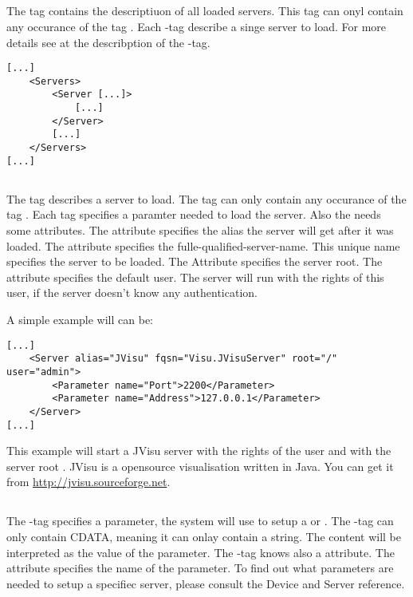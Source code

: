 \subsection{}
The tag  contains the descriptiuon of all loaded servers. This tag can onyl 
contain any occurance of the tag . Each -tag describe a 
singe server to load. For more details see at the describption of the -tag.

\begin{verbatim}
[...]
    <Servers>
        <Server [...]>
            [...]
        </Server>
        [...]
    </Servers>
[...]
\end{verbatim}


\subsection{}
The tag  describes a server to load. The tag can only contain any occurance of the tag
. Each  tag specifies a paramter needed to load the server.
Also the  needs some attributes. The attribute  specifies the alias the
server will get after it was loaded. The attribute  specifies the fulle-qualified-server-name. 
This unique name specifies the server to be loaded. The Attribute  specifies the server root.
 The attribute 
 specifies the default user. The server will run with the rights of this user, if the 
server doesn't know any authentication. 

A simple example will can be:
\begin{verbatim}
[...]
    <Server alias="JVisu" fqsn="Visu.JVisuServer" root="/" user="admin">
        <Parameter name="Port">2200</Parameter>
        <Parameter name="Address">127.0.0.1</Parameter>
    </Server>
[...]
\end{verbatim}
This example will start a JVisu server with the rights of the user  and
with the server root . JVisu is a opensource visualisation written in Java.
You can get it from \url{http://jvisu.sourceforge.net}.

\subsection{}
The -tag specifies a parameter, the system will use to setup
a  or . The -tag can only 
contain CDATA, meaning it can onlay contain a string. The content will be 
interpreted as the value of the parameter. The -tag
knows also a attribute. The attribute  specifies the name
of the parameter. To find out what parameters are needed to setup
a specifiec server, please consult the Device and Server reference.


